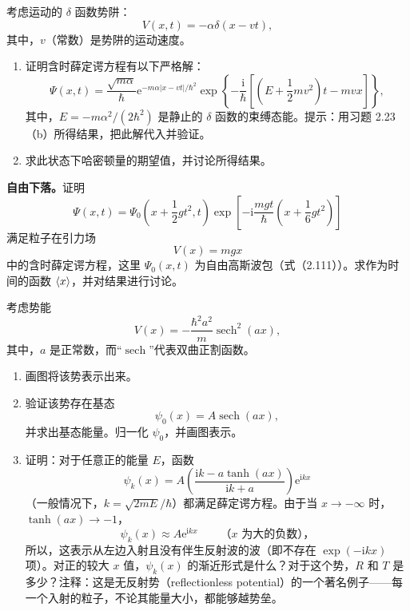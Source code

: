 考虑运动的 $\delta$ 函数势阱：
\[
V(x,t)=-\alpha\delta(x-vt),
\]
其中，$v$（常数）是势阱的运动速度。
\begin{enumerate}
\item 证明含时薛定谔方程有以下严格解：
\[
\Psi(x,t)=\frac{\sqrt{m\alpha}}{\hbar}
\mathrm{e}^{-m\alpha|x-vt|/\hbar^2}
\exp\left\{-\frac{\mathrm{i}}{\hbar}\left[
\left(E+\frac12mv^2\right)t-mvx\right]\right\},
\]
其中，$E=-m\alpha^2/(2\hbar^2)$ 是静止的 $\delta$ 函数的束缚态能。提示：用习题 2.23（b）所得结果，把此解代入并验证。
\item 求此状态下哈密顿量的期望值，并讨论所得结果。
\end{enumerate}
\vfill

\textbf{自由下落。}证明
\[
\Psi(x,t)=\Psi_0\left(x+\frac12gt^2,t\right)
\exp\left[-\mathrm{i}\frac{mgt}{\hbar}\left(x+\frac16gt^2\right)\right]
\]
满足粒子在引力场
\[
V(x)=mgx
\]
中的含时薛定谔方程，这里 $\Psi_0(x,t)$ 为自由高斯波包（式（2.111））。求作为时间的函数 $\left\langle x\right\rangle$，并对结果进行讨论。
\vfill

考虑势能
\[
V(x)=-\frac{\hbar^2a^2}{m}\operatorname{sech}^2(ax),
\]
其中，$a$ 是正常数，而“$\operatorname{sech}$”代表双曲正割函数。
\begin{enumerate}
\item 画图将该势表示出来。
\item 验证该势存在基态
\[
\psi_0(x)=A\operatorname{sech}(ax),
\]
并求出基态能量。归一化 $\psi_0$，并画图表示。
\item 证明：对于任意正的能量 $E$，函数
\[
\psi_k(x)=A\left(\frac{\mathrm{i}k-a\tanh(ax)}{\mathrm{i}k+a}\right)\mathrm{e}^{\mathrm{i}kx}
\]
（一般情况下，$k=\sqrt{2mE}/\hbar$）都满足薛定谔方程。由于当 $x\to-\infty$ 时，$\tanh(ax)\to-1$，
\[
\psi_k(x)\approx A\mathrm{e}^{\mathrm{i}kx}\qquad\text{（$x$ 为大的负数），}
\]
所以，这表示从左边入射且没有伴生反射波的波（即不存在 $\exp(-\mathrm{i}kx)$ 项）。对正的较大 $x$ 值，$\psi_k(x)$ 的渐近形式是什么？对于这个势，$R$ 和 $T$ 是多少？注释：这是无反射势（reflectionless potential）的一个著名例子——每一个入射的粒子，不论其能量大小，都能够越势垒。
\end{enumerate}
\vfill

